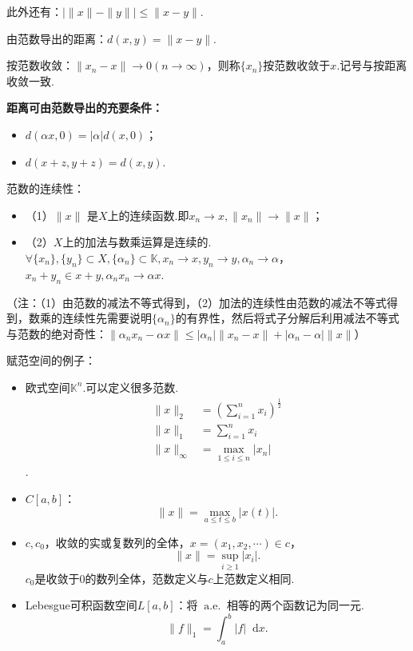 \documentclass[bwprint, withoutpreface]{cumcmthesis}
\newcommand*{\aev}{\mathop{}\!\mathrm{a.e.}\!\mathop{}}
\newcommand*{\dif}{\mathop{}\!\mathrm{d}}
\newcommand*{\norm}[1]{\| #1 \|}
\newcommand*{\nnorm}[2]{\| #1 \|_{#2}}
\begin{document}
此外还有：$|\norm{x} - \norm{y}| \leqslant \norm{x - y}$.

由范数导出的距离：$d(x, y) = \norm{x - y}$.

按范数收敛：$\norm{x_n - x} \to 0(n \to \infty)$，则称$\{x_n\}$按范数收敛于$x$.记号与按距离收敛一致.

\textbf{距离可由范数导出的充要条件：}
\begin{itemize}[itemindent=2em]
	\item $d(\alpha x, 0) = |\alpha| d(x, 0)$；
	\item $d(x + z, y + z) = d(x, y)$.
\end{itemize}

范数的连续性：
\begin{itemize}[itemindent=2em]
	\item （1）$\norm{x}$ 是$X$上的连续函数.即$x_n \to x, \norm{x_n} \to \norm{x}$；
	\item （2）$X$上的加法与数乘运算是连续的.$\forall \{x_n\}, \{y_n\} \subset X, \{\alpha_n\} \subset \mathbb{K}, x_n \to x, y_n \to y, \alpha_n \to \alpha$，$x_n + y_n \in x + y, \alpha_n x_n \to \alpha x$.
\end{itemize}

（注：（1）由范数的减法不等式得到，（2）加法的连续性由范数的减法不等式得到，数乘的连续性先需要说明$\{\alpha_n\}$的有界性，然后将式子分解后利用减法不等式与范数的绝对奇性：$\norm{\alpha_n x_n - \alpha x} \leqslant |\alpha_n| \norm{x_n - x} + |\alpha_n - \alpha| \norm{x}$）

赋范空间的例子：
\begin{itemize}[itemindent=2em]
	\item 欧式空间$\mathbb{K}^n$.可以定义很多范数.
	\begin{align*}
		\nnorm{x}{2} & = (\sum_{i = 1}^{n}{x_i})^\frac{1}{2} \\
		\nnorm{x}{1} & = \sum_{i = 1}^{n}{x_i} \\
		\nnorm{x}{\infty} & = \max_{1 \leqslant i \leqslant n}{|x_n|}
	\end{align*}.
	\item $C[a, b]$：\[\norm{x} = \max_{a \leqslant t \leqslant b}{|x(t)|}.\]
	\item $c, c_0$，收敛的实或复数列的全体，$x = (x_1, x_2, \cdots) \in c$，\[\norm{x} = \sup_{i \geqslant 1}{|x_i|}.\] $c_0$是收敛于$0$的数列全体，范数定义与$c$上范数定义相同.
	\item Lebesgue可积函数空间$L[a, b]$：将$\aev$相等的两个函数记为同一元.\[\nnorm{f}{1} = \int_{a}^{b}|f| \dif x.\]
\end{itemize}
\end{document}
